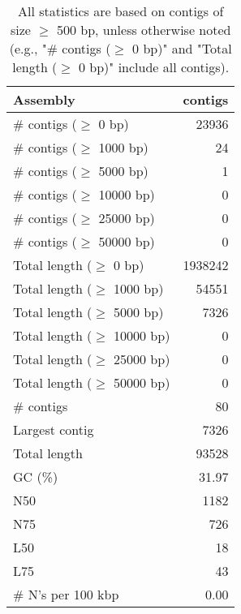 \documentclass[12pt,a4paper]{article}
\begin{document}
\begin{table}[ht]
\begin{center}
\caption{All statistics are based on contigs of size $\geq$ 500 bp, unless otherwise noted (e.g., "\# contigs ($\geq$ 0 bp)" and "Total length ($\geq$ 0 bp)" include all contigs).}
\begin{tabular}{|l*{1}{|r}|}
\hline
Assembly & contigs \\ \hline
\# contigs ($\geq$ 0 bp) & 23936 \\ \hline
\# contigs ($\geq$ 1000 bp) & 24 \\ \hline
\# contigs ($\geq$ 5000 bp) & 1 \\ \hline
\# contigs ($\geq$ 10000 bp) & 0 \\ \hline
\# contigs ($\geq$ 25000 bp) & 0 \\ \hline
\# contigs ($\geq$ 50000 bp) & 0 \\ \hline
Total length ($\geq$ 0 bp) & 1938242 \\ \hline
Total length ($\geq$ 1000 bp) & 54551 \\ \hline
Total length ($\geq$ 5000 bp) & 7326 \\ \hline
Total length ($\geq$ 10000 bp) & 0 \\ \hline
Total length ($\geq$ 25000 bp) & 0 \\ \hline
Total length ($\geq$ 50000 bp) & 0 \\ \hline
\# contigs & 80 \\ \hline
Largest contig & 7326 \\ \hline
Total length & 93528 \\ \hline
GC (\%) & 31.97 \\ \hline
N50 & 1182 \\ \hline
N75 & 726 \\ \hline
L50 & 18 \\ \hline
L75 & 43 \\ \hline
\# N's per 100 kbp & 0.00 \\ \hline
\end{tabular}
\end{center}
\end{table}
\end{document}
